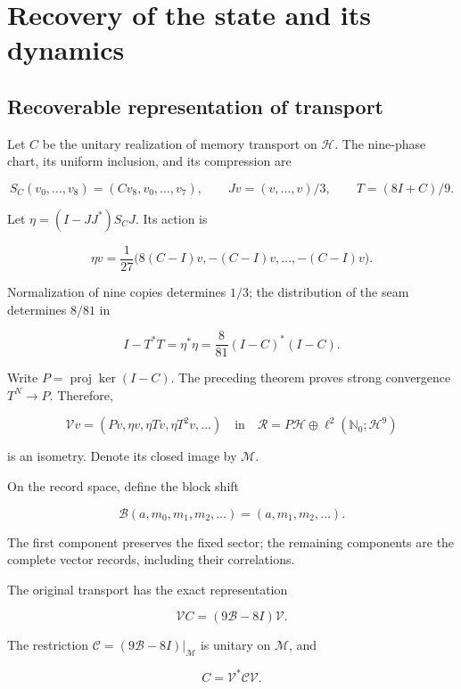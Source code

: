 \section{Recovery of the state and its dynamics}
\label{nuclear:3}
\subsection{Recoverable representation of transport}

Let \(C\) be the unitary realization of memory transport on \(\mathcal H\). The nine-phase chart, its uniform inclusion, and its compression are

\[
S_C(v_0,\ldots,v_8)=(Cv_8,v_0,\ldots,v_7),\qquad
Jv=(v,\ldots,v)/3,\qquad T=(8I+C)/9.
\]

Let \(\eta=(I-JJ^*)S_CJ\). Its action is

\[
\eta v=\frac1{27}\bigl(8(C-I)v,-(C-I)v,\ldots,-(C-I)v\bigr).
\]

Normalization of nine copies determines \(1/3\); the distribution of the seam determines \(8/81\) in

\begin{equation}
I-T^*T=\eta^*\eta=\frac8{81}(I-C)^*(I-C).
\label{nuc03:eq:1}
\end{equation}

Write \(P=\operatorname{proj}\ker(I-C)\). The preceding theorem proves strong convergence \(T^N\to P\). Therefore,

\begin{equation}
\mathcal Vv=(Pv,\eta v,\eta Tv,\eta T^2v,\ldots)
\quad\text{in}\quad
\mathcal R=P\mathcal H\oplus\ell^2(\mathbb N_0;\mathcal H^9)
\label{nuc03:eq:2}
\end{equation}

is an isometry. Denote its closed image by \(\mathcal M\).

On the record space, define the block shift

\begin{equation}
\mathcal B(a,m_0,m_1,m_2,\ldots)=(a,m_1,m_2,\ldots).
\label{nuc03:eq:3}
\end{equation}

The first component preserves the fixed sector; the remaining components are the complete vector records, including their correlations.

\begin{theorem}
\label{nuc03:transporte}
The original transport has the exact representation

\begin{equation}
\boxed{\mathcal V C=(9\mathcal B-8I)\mathcal V.}
\label{nuc03:eq:4}
\end{equation}

The restriction \(\mathcal C=(9\mathcal B-8I)|_{\mathcal M}\) is unitary on \(\mathcal M\), and

\begin{equation}
C=\mathcal V^*\mathcal C\mathcal V.
\label{nuc03:eq:5}
\end{equation}
\end{theorem}


